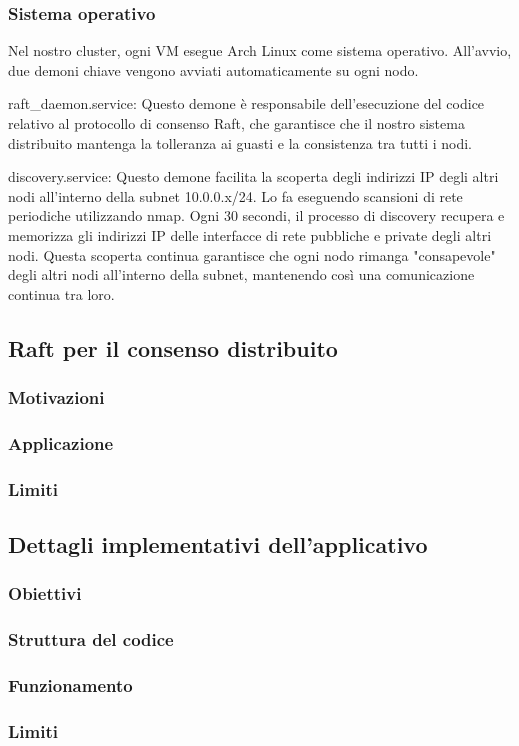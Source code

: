 \subsubsection{Sistema operativo}
Nel nostro cluster, ogni VM esegue Arch Linux come sistema operativo. All'avvio, due demoni chiave vengono avviati automaticamente su ogni nodo.

    raft_daemon.service: Questo demone è responsabile dell'esecuzione del codice relativo al protocollo di consenso Raft, che garantisce che il nostro sistema distribuito mantenga la tolleranza ai guasti e la consistenza tra tutti i nodi.

    discovery.service: Questo demone facilita la scoperta degli indirizzi IP degli altri nodi all'interno della subnet 10.0.0.x/24. Lo fa eseguendo scansioni di rete periodiche utilizzando nmap. Ogni 30 secondi, il processo di discovery recupera e memorizza gli indirizzi IP delle interfacce di rete pubbliche e private degli altri nodi. Questa scoperta continua garantisce che ogni nodo rimanga "consapevole" degli altri nodi all'interno della subnet, mantenendo così una comunicazione continua tra loro.


\subsection{Raft per il consenso distribuito}
\subsubsection{Motivazioni}

\subsubsection{Applicazione}

\subsubsection{Limiti}

\subsection{Dettagli implementativi dell'applicativo}
\subsubsection{Obiettivi}

\subsubsection{Struttura del codice}

\subsubsection{Funzionamento}

\subsubsection{Limiti}
